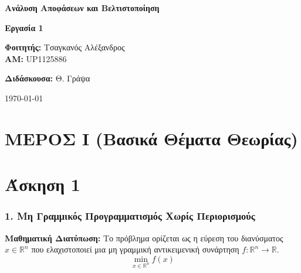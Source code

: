 \documentclass[a4paper,12pt]{article}
\begin{document}
\begin{titlepage}
    \centering
    \vspace*{2cm}
    
    {\Huge \textbf{Ανάλυση Αποφάσεων και Βελτιστοποίηση}}
    
    \vspace{1.5cm}
    
    {\LARGE \textbf{Εργασία 1}}
    
    \vspace{3cm}
    
    {\Large
    \textbf{Φοιτητής:} Τσαγκανός Αλέξανδρος\\
    \vspace{0.2cm}
    \textbf{ΑΜ:} UP1125886
    }
    
    \vspace{2cm}
    
    {\Large
    \textbf{Διδάσκουσα:} Θ. Γράψα
    }
    
    \vfill
    
    {\Large \today}
    
\end{titlepage}

\newpage

\section*{ΜΕΡΟΣ I (Βασικά Θέματα Θεωρίας)}


\section*{Άσκηση 1}

\subsubsection*{1. Μη Γραμμικός Προγραμματισμός Χωρίς Περιορισμούς}
\textbf{Μαθηματική Διατύπωση:}
Το πρόβλημα ορίζεται ως η εύρεση του διανύσματος $x \in \mathbb{R}^n$ που ελαχιστοποιεί μια μη γραμμική αντικειμενική συνάρτηση $f: \mathbb{R}^n \rightarrow \mathbb{R}$.
\begin{equation}
 \min_{x \in \mathbb{R}^n} f(x)
\end{equation}
\end{document}
